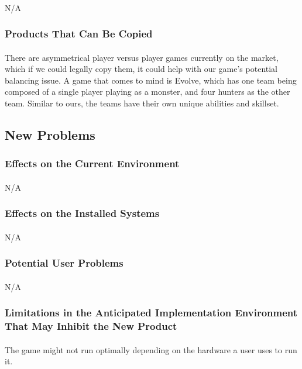 \documentclass[12pt, titlepage]{article}
\begin{document}
\paragraph{}N/A
\subsubsection{Products That Can Be Copied}
\paragraph{}There are asymmetrical player versus player games currently on the market, which if we could legally copy them, it could help with our game's potential balancing issue. A game that comes to mind is Evolve, which has one team being composed of a single player playing as a monster, and four hunters as the other team. Similar to ours, the teams have their own unique abilities and skillset. 
\subsection{New Problems}
\subsubsection{Effects on the Current Environment}
\paragraph{}N/A
\subsubsection{Effects on the Installed Systems}
\paragraph{}N/A
\subsubsection{Potential User Problems}
\paragraph{}N/A
\subsubsection{Limitations in the Anticipated Implementation Environment That May Inhibit the New Product}
\paragraph{}The game might not run optimally depending on the hardware a user uses to run it. 
\end{document}
